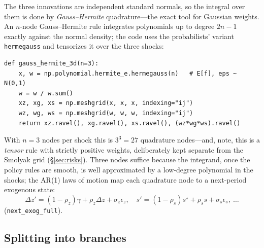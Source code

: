 \documentclass[11pt]{article}
\newcommand{\code}[1]{\texttt{#1}}
\begin{document}
The three innovations are independent standard normals, so the integral
over them is done by \emph{Gauss--Hermite} quadrature---the exact tool for
Gaussian weights. An $n$-node Gauss--Hermite rule integrates polynomials up
to degree $2n-1$ exactly against the normal density; the code uses the
probabilists' variant \code{hermegauss} and tensorizes it over the three
shocks:
\begin{verbatim}
def gauss_hermite_3d(n=3):
    x, w = np.polynomial.hermite_e.hermegauss(n)   # E[f], eps ~ N(0,1)
    w = w / w.sum()
    xz, xg, xs = np.meshgrid(x, x, x, indexing="ij")
    wz, wg, ws = np.meshgrid(w, w, w, indexing="ij")
    return xz.ravel(), xg.ravel(), xs.ravel(), (wz*wg*ws).ravel()
\end{verbatim}
With $n=3$ nodes per shock this is $3^3=27$ quadrature nodes---and, note,
this is a \emph{tensor} rule with strictly positive weights, deliberately
kept separate from the Smolyak grid (\S\ref{sec:risks}). Three nodes suffice
because the integrand, once the policy rules are smooth, is well
approximated by a low-degree polynomial in the shocks; the AR(1) laws of
motion map each quadrature node to a next-period exogenous state:
\begin{equation}
\Delta z' = (1-\rho_z)\gamma+\rho_z\Delta z+\sigma_z\epsilon_z,\quad
s' = (1-\rho_s)s^\star+\rho_s s+\sigma_s\epsilon_s, \ \dots
\label{eq:ar1}
\end{equation}
(\code{next\_exog\_full}).

\subsection{Splitting into branches}
\label{sec:branch-split}
\end{document}
